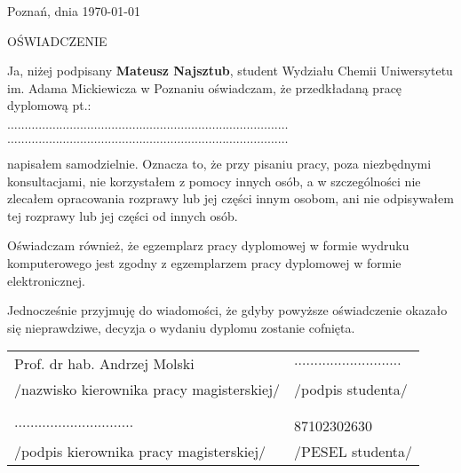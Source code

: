 \thispagestyle{empty}
\begin{singlespace}
\setlength{\parskip}{0.5cm}
\setlength{\parindent}{0pt}
\begin{flushright}
Poznań, dnia \today{}
\end{flushright}
\begin{center} 
\LARGE{OŚWIADCZENIE}
\end{center}
\vspace{0.5cm}
Ja, niżej podpisany \textbf{Mateusz Najsztub}, student Wydziału Chemii Uniwersytetu im. Adama Mickiewicza w Poznaniu oświadczam, że przedkładaną pracę dyplomową pt.: 

$\dots\dots\dots\dots\dots\dots\dots\dots\dots\dots\dots\dots\dots\dots\dots\dots\dots\dots\dots\dots\dots\dots\dots\dots\dots\dots\dots$

$\dots\dots\dots\dots\dots\dots\dots\dots\dots\dots\dots\dots\dots\dots\dots\dots\dots\dots\dots\dots\dots\dots\dots\dots\dots\dots\dots$

napisałem samodzielnie. Oznacza to, że przy pisaniu pracy, poza niezbędnymi konsultacjami, nie korzystałem z pomocy innych osób, a w szczególności nie zlecałem opracowania rozprawy lub jej części innym osobom, ani nie odpisywałem tej rozprawy lub jej części od innych osób. 

Oświadczam również, że egzemplarz pracy dyplomowej w formie wydruku komputerowego jest zgodny z egzemplarzem pracy dyplomowej w formie elektronicznej.

Jednocześnie przyjmuję do wiadomości, że gdyby powyższe oświadczenie okazało się nieprawdziwe, decyzja o wydaniu dyplomu zostanie cofnięta.
\vspace{0.5cm}
\begin{center}
\begin{tabular}{p{10 cm} p{10cm}}
Prof. dr hab. Andrzej Molski & $\dots\dots\dots\dots\dots\dots\dots\dots\dots$\\
/nazwisko kierownika pracy magisterskiej/ & /podpis studenta/\\
& \\
& \\
$\dots\dots\dots\dots\dots\dots\dots\dots\dots\dots$ & 87102302630\\
/podpis kierownika pracy magisterskiej/ & /PESEL studenta/
\end{tabular}


\end{center}
\end{singlespace}
